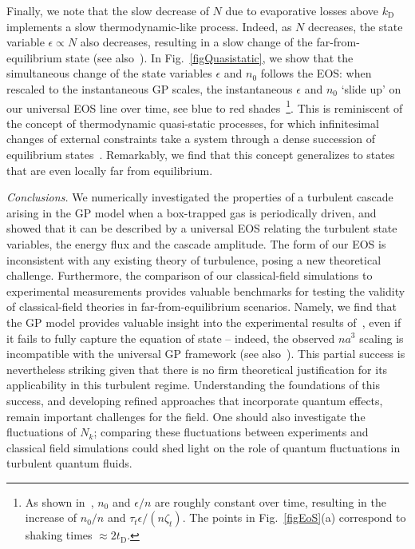 \documentclass[prl,aps,twocolumn, a4paper,longbibliography,superscriptaddress]{revtex4-2}
\newcommand{\kD}{k_{\textrm{D}}}
\newcommand{\tD}{t_{\textrm{D}}}
\begin{document}
Finally, we note that the slow decrease of $N$ due to evaporative losses above $\kD$ implements a slow thermodynamic-like process.
Indeed, as $N$ decreases, the state variable $\epsilon\propto N$ also decreases, resulting in a slow change of the far-from-equilibrium state (see also~\cite{Supplementary}). In Fig.~\ref{figQuasistatic}, we show that the simultaneous change of the state variables $\epsilon$ and $n_0$ follows the EOS: when rescaled to the instantaneous GP scales, the instantaneous $\epsilon$ and $n_0$ `slide up' on our universal EOS line over time, see blue to red shades~\footnote{As shown in~\cite{Supplementary}, $n_0$ and $\epsilon/n$ are roughly constant over time, resulting in the increase of $n_0/n$ and $\tau_t\epsilon/(n\zeta_t)$.  The points in Fig.~\ref{figEoS}(a) correspond to shaking times $\approx2\tD$.}. This is reminiscent of the concept of thermodynamic quasi-static processes, for which infinitesimal changes of external constraints take a system through a dense succession of equilibrium states~\cite{Callen:1991}. Remarkably, we find that this concept generalizes to states that are even locally far from equilibrium.


\textit{Conclusions.} We numerically investigated the properties of a turbulent cascade arising in the GP model when a box-trapped gas is periodically driven, and showed that it can be described by a universal EOS relating the turbulent state variables, the energy flux and the cascade amplitude.
The form of our EOS is inconsistent with any existing theory of turbulence, posing a new theoretical challenge. Furthermore, the comparison of our classical-field simulations to experimental measurements provides valuable benchmarks for testing the validity of classical-field theories in far-from-equilibrium scenarios.
Namely, we find that the GP model provides valuable insight into the experimental results of~\cite{Dogra:2023}, even if it fails to fully capture the equation of state -- indeed, the observed $na^3$ scaling is incompatible with the universal GP framework (see also~\cite{Supplementary}).
This partial success is nevertheless striking given that there is no firm theoretical justification for its applicability in this turbulent regime. Understanding the foundations of this success, and developing refined approaches that incorporate quantum effects, remain important challenges for the field.
One should also investigate the fluctuations of $N_k$; comparing these fluctuations between experiments and classical field simulations could shed light on the role of quantum fluctuations in turbulent quantum fluids.
\end{document}
